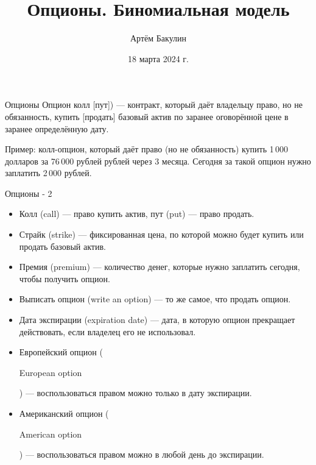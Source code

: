 \documentclass{beamer}
\title{Опционы. Биномиальная модель}
\author{Артём Бакулин}
\date{18 марта 2024 г.}
\newcommand{\en}[1]{\begin{otherlanguage}{english}#1\end{otherlanguage}}
\begin{document}
\begin{frame}
\titlepage
\end{frame}



\begin{frame}{Опционы}
\justifying
\alert{Опцион колл [пут])} --- контракт, который даёт владельцу право, но не обязанность, купить [продать] базовый актив по заранее оговорённой цене в заранее определённую дату. 

\justify
Пример: колл-опцион, который даёт право (но не обязанность) купить 1\,000 долларов за 76\,000 рублей рублей через 3 месяца. Сегодня за такой опцион нужно заплатить 2\,000 рублей.
\end{frame}



\begin{frame}{Опционы - 2}
\begin{itemize}
\justifying
\item \alert{Колл} (call) --- право купить актив, \alert{пут} (put) --- право продать.
\item \alert{Страйк} (strike) --- фиксированная цена, по которой можно будет купить или продать базовый актив.
\item \alert{Премия} (premium) --- количество денег, которые нужно заплатить сегодня, чтобы получить опцион.
\item \alert{Выписать} опцион (write an option) --- то же самое, что продать опцион.
\item \alert{Дата экспираци}и (expiration date) --- дата, в которую опцион прекращает действовать, если владелец его не использовал.
\item \alert{Европейский} опцион (\en{European option}) --- воспользоваться правом можно только в дату экспирации.
\item \alert{Американский} опцион (\en{American option}) --- воспользоваться правом можно в любой день до экспирации.
\end{itemize}
\end{frame}



\newcommand{\circlewithtext}[3]{
    \node[circle, fill, inner sep = 1.5pt] at (#1, #2) {};
    \node[anchor = north] at (#1, #2) {#3};
}
\end{document}
